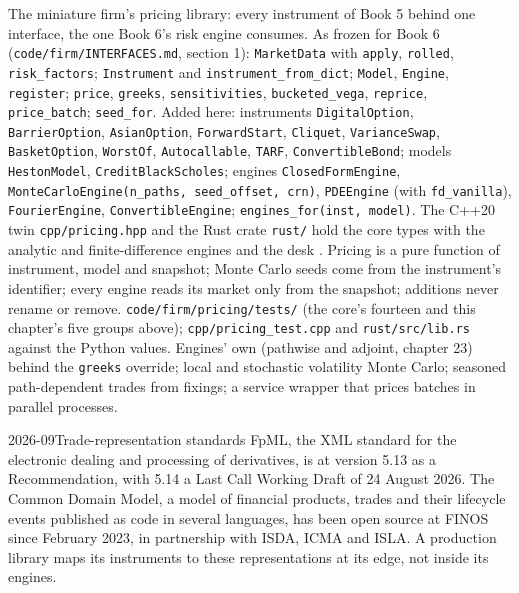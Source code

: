 \begin{build}
 The miniature firm's pricing library: every instrument of Book 5 behind one interface, the one Book 6's risk engine consumes.
 As frozen for Book 6 (\texttt{code/firm/INTERFACES.md}, section 1): \texttt{MarketData} with \texttt{apply}, \texttt{rolled},
\texttt{risk\_factors}; \texttt{Instrument} and \texttt{instrument\_from\_dict}; \texttt{Model}, \texttt{Engine}, \texttt{register}; \texttt{price},
\texttt{greeks}, \texttt{sensitivities}, \texttt{bucketed\_vega}, \texttt{reprice}, \texttt{price\_batch}; \texttt{seed\_for}. Added here: instruments
\texttt{DigitalOption}, \texttt{BarrierOption}, \texttt{AsianOption}, \texttt{ForwardStart}, \texttt{Cliquet}, \texttt{VarianceSwap}, \texttt{BasketOption},
\texttt{WorstOf}, \texttt{Autocallable}, \texttt{TARF}, \texttt{ConvertibleBond}; models \texttt{HestonModel}, \texttt{CreditBlackScholes}; engines
\texttt{ClosedFormEngine}, \texttt{MonteCarloEngine(n\_paths, seed\_offset, crn)}, \texttt{PDEEngine} (with \texttt{fd\_vanilla}), \texttt{FourierEngine},
\texttt{ConvertibleEngine}; \texttt{engines\_for(inst, model)}. The C++20 twin \texttt{cpp/pricing.hpp} and the Rust crate \texttt{rust/} hold the core types
with the analytic and finite-difference engines and the desk .
 Pricing is a pure function of instrument, model and snapshot; Monte Carlo seeds come from the instrument's identifier; every engine reads its
market only from the snapshot; additions never rename or remove.
 \texttt{code/firm/pricing/tests/} (the core's fourteen and this chapter's five groups above); \texttt{cpp/pricing\_test.cpp} and
\texttt{rust/src/lib.rs} against the Python values.
 Engines' own  (pathwise and adjoint, chapter 23) behind the \texttt{greeks} override; local and stochastic volatility Monte Carlo; seasoned
path-dependent trades from fixings; a service wrapper that prices batches in parallel processes.
\end{build}

\begin{dated}{2026-09}{Trade-representation standards}\label{dat:dv:build-a-pricing-library:standards}
FpML, the XML standard for the electronic dealing and processing of derivatives, is at version 5.13 as a Recommendation, with 5.14 a Last Call Working Draft of
24 August 2026. The Common Domain Model, a model of financial products, trades and their lifecycle events published as code in several languages, has been open
source at FINOS since February 2023, in partnership with ISDA, ICMA and ISLA. A production library maps its instruments to these representations at its edge,
not inside its engines.
\end{dated}

